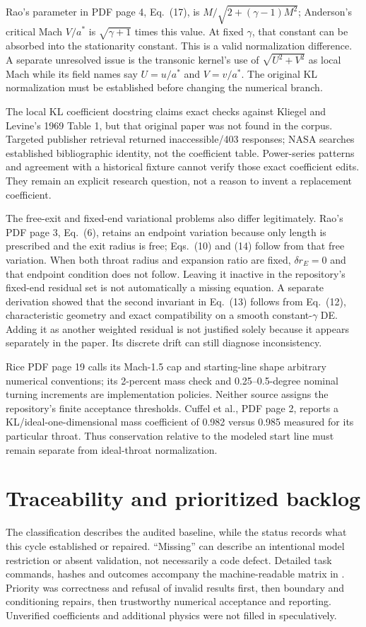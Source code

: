 Rao's parameter in PDF page 4, Eq.~(17), is
$M/\sqrt{2+(\gamma-1)M^2}$; Anderson's critical Mach $V/a^*$ is
$\sqrt{\gamma+1}$ times this value. At fixed $\gamma$, that constant can be
absorbed into the stationarity constant. This is a valid normalization
difference. A separate unresolved issue is the transonic kernel's use of
$\sqrt{U^2+V^2}$ as local Mach while its field names say $U=u/a^*$ and
$V=v/a^*$. The original KL normalization must be established before changing
the numerical branch.

The local KL coefficient docstring claims exact checks against Kliegel and
Levine's 1969 Table 1, but that original paper was not found in the corpus.
Targeted publisher retrieval returned inaccessible/403 responses;
NASA searches established bibliographic identity, not the coefficient table.
Power-series patterns and agreement with a historical fixture cannot verify
those exact coefficient edits. They remain an explicit research question,
not a reason to invent a replacement coefficient.

The free-exit and fixed-end variational problems also differ legitimately.
Rao's PDF page 3, Eq.~(6), retains an endpoint variation because only
length is prescribed and the exit radius is free; Eqs.~(10) and (14)
follow from that free variation. When both throat radius and expansion
ratio are fixed, $\delta r_E=0$ and that endpoint condition does not follow.
Leaving it inactive in the repository's fixed-end residual set is not
automatically a missing equation. A separate derivation showed that the
second invariant in Eq.~(13) follows from Eq.~(12), characteristic geometry
and exact compatibility on a smooth constant-$\gamma$ DE. Adding it as
another weighted residual is not justified solely because it appears
separately in the paper. Its discrete drift can still diagnose inconsistency.

Rice PDF page 19 calls its Mach-1.5 cap and starting-line shape arbitrary
numerical conventions; its 2-percent mass check and 0.25--0.5-degree nominal
turning increments are implementation policies. Neither source assigns the
repository's finite acceptance thresholds. Cuffel et al., PDF page 2, reports
a KL/ideal-one-dimensional mass coefficient of 0.982 versus 0.985 measured
for its particular throat. Thus conservation relative to the modeled start
line must remain separate from ideal-throat normalization.

\section{Traceability and prioritized backlog}
The classification describes the audited baseline, while the status records
what this cycle established or repaired. ``Missing'' can describe an intentional
model restriction or absent validation, not necessarily a code defect. Detailed
task commands, hashes and outcomes accompany the machine-readable matrix in
.
Priority was correctness and refusal of invalid results first, then boundary
and conditioning repairs, then trustworthy numerical acceptance and reporting.
Unverified coefficients and additional physics were not filled in speculatively.


